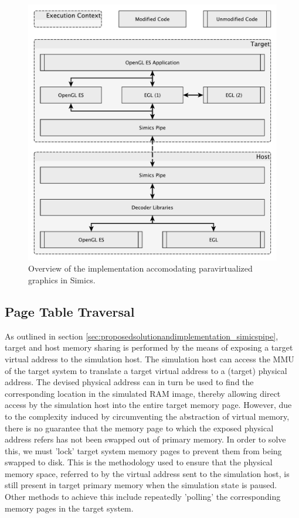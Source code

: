 \begin{figure}
\centering
\includegraphics[width=\linewidth]{img/yedoverview.pdf}
\caption[Paravirtualization implementation overview]{Overview of the implementation accomodating paravirtualized graphics in Simics.}
\label{fig:overview}
\end{figure}

\subsection{Page Table Traversal}
\label{sec:proposedsolutionandimplementation_pagetabletraversal}
As outlined in section \ref{sec:proposedsolutionandimplementation_simicspipe}, target and host memory sharing is performed by the means of exposing a target virtual address to the simulation host.
The simulation host can access the MMU of the target system to translate a target virtual address to a (target) physical address. The devised physical address can in turn be used to find the corresponding location in the simulated RAM image, thereby allowing direct access by the simulation host into the entire target memory page.
However, due to the complexity induced by circumventing the abstraction of virtual memory, there is no guarantee that the memory page to which the exposed physical address refers has not been swapped out of primary memory.
In order to solve this, we must 'lock' target system memory pages to prevent them from being swapped to disk.
This is the methodology used to ensure that the physical memory space, referred to by the virtual address sent to the simulation host, is still present in target primary memory when the simulation state is paused.
Other methods to achieve this include repeatedly 'polling' the corresponding memory pages in the target system.

